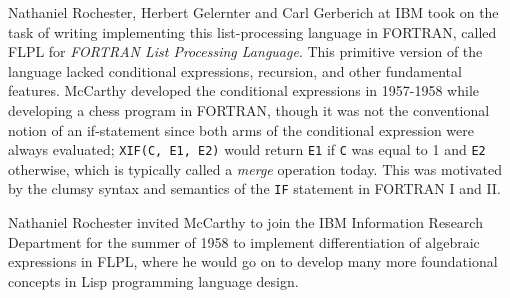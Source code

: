 Nathaniel Rochester, Herbert Gelernter and Carl Gerberich at IBM
took on the task of writing implementing this list-processing language
in FORTRAN, called FLPL for \textit{FORTRAN List Processing Language}.
This primitive version of the language lacked conditional expressions, recursion, and other
fundamental features.
McCarthy developed the conditional expressions in 1957-1958 while developing a chess program
in FORTRAN, though it was not the conventional notion of an if-statement since both arms
of the conditional expression were always evaluated; \texttt{XIF(C, E1, E2)} would return
\texttt{E1} if \texttt{C} was equal to 1 and \texttt{E2} otherwise, which is typically called
a \textit{merge} operation today.
This was motivated by the clumsy syntax and semantics of the \texttt{IF} statement in FORTRAN I and II.

Nathaniel Rochester invited McCarthy to join the IBM Information Research Department for the
summer of 1958 to implement differentiation of algebraic expressions in FLPL,
where he would go on to develop many more foundational concepts in Lisp programming
language design.

